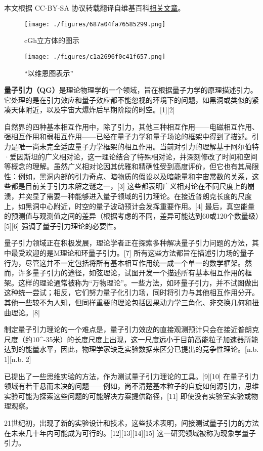 
本文根据 CC-BY-SA 协议转载翻译自维基百科\href{https://en.wikipedia.org/wiki/Quantum_gravity}{相关文章}。
\begin{figure}[ht]
\centering
\texttt{[image: ./figures/687a04fa76585299.png]}
\caption{cGh立方体的图示} \label{fig_LZYL_1}
\end{figure}
\begin{figure}[ht]
\centering
\texttt{[image: ./figures/c1a2696f0c41f657.png]}
\caption{“以维恩图表示”} \label{fig_LZYL_2}
\end{figure}
\textbf{量子引力（QG）}是理论物理学的一个领域，旨在根据量子力学的原理描述引力。它处理的是在引力效应和量子效应都不能忽视的环境下的问题，如黑洞或类似的紧凑天体附近，以及宇宙大爆炸后早期阶段的时空。[1][2]

自然界的四种基本相互作用中，除了引力，其他三种相互作用——电磁相互作用、强相互作用和弱相互作用——已经在量子力学和量子场论的框架中得到了描述。引力是唯一尚未完全适应量子力学框架的相互作用。当前对引力的理解基于阿尔伯特·爱因斯坦的广义相对论，这一理论结合了特殊相对论，并深刻修改了时间和空间等概念的理解。虽然广义相对论因其优雅和精确性受到高度评价，但它也有其局限性：例如，黑洞内部的引力奇点、暗物质的假设以及暗能量和宇宙常数的关系，这些都是目前关于引力未解之谜之一，[3] 这些都表明广义相对论在不同尺度上的崩溃，并突显了需要一种能够进入量子领域的引力理论。在接近普朗克长度的尺度上，如黑洞中心附近，时空的量子波动预计会发挥重要作用。[4] 最后，真空能量的预测值与观测值之间的差异（根据考虑的不同，差异可能达到60或120个数量级）[5][6] 强调了量子引力理论的必要性。

量子引力领域正在积极发展，理论学者正在探索多种解决量子引力问题的方法，其中最受欢迎的是M理论和环量子引力。[7] 所有这些方法都旨在描述引力场的量子行为，尽管这并不一定包括将所有基本相互作用统一成一个单一的数学框架。然而，许多量子引力的途径，如弦理论，试图开发一个描述所有基本相互作用的框架。这样的理论通常被称为“万物理论”。一些方法，如环量子引力，并不试图做出这种统一尝试；相反，它们努力量子化引力场，同时将引力与其他相互作用分开。其他一些较不为人知，但同样重要的理论包括因果动力学三角化、非交换几何和扭曲理论。[8]

制定量子引力理论的一个难点是，量子引力效应的直接观测预计只会在接近普朗克尺度（约10^-35米）的长度尺度上出现，这一尺度远小于目前高能粒子加速器所能达到的能量水平，因此，物理学家缺乏实验数据来区分已提出的竞争性理论。[n.b. 1][n.b. 2]

已提出了一些思维实验的方法，作为测试量子引力理论的工具。[9][10] 在量子引力领域有若干悬而未决的问题——例如，尚不清楚基本粒子的自旋如何源引力，思维实验可能为探索这些问题的可能解决方案提供路径，[11] 即使没有实验室实验或物理观察。

21世纪初，出现了新的实验设计和技术，这些技术表明，间接测试量子引力的方法在未来几十年内可能成为可行的。[12][13][14][15] 这一研究领域被称为现象学量子引力。